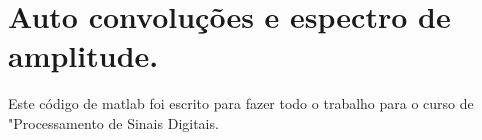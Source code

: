 \appendix
\label{apendice}

\chapter{ Auto convoluções e espectro de amplitude.}
\label{apendice_A}

Este código de matlab foi escrito para fazer todo o trabalho para o curso de "Processamento de Sinais Digitais.




